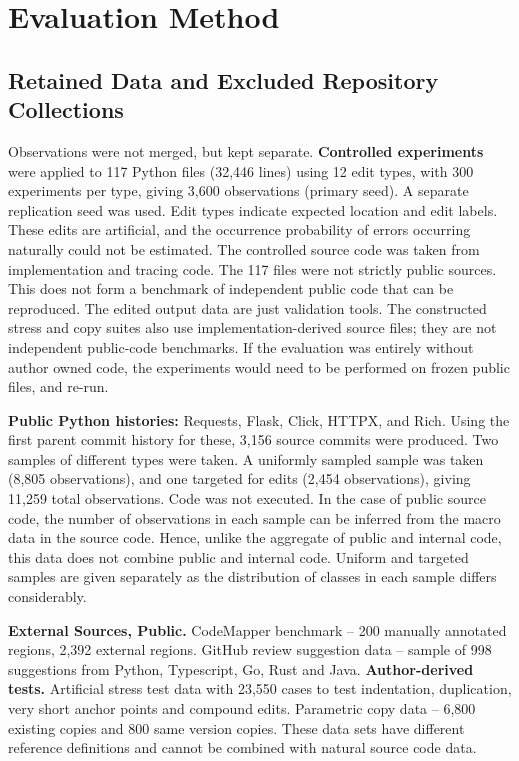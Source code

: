 \documentclass[10pt,conference,letterpaper]{IEEEtran}
\begin{document}
\section{Evaluation Method}
\subsection{Retained Data and Excluded Repository Collections}
Observations were not merged, but kept separate. \textbf{Controlled experiments} were applied to 117 Python files (32,446 lines) using 12 edit types, with 300 experiments per type, giving 3,600 observations (primary seed). A separate replication seed was used. Edit types indicate expected location and edit labels. These edits are artificial, and the occurrence probability of errors occurring naturally could not be estimated. The controlled source code was taken from implementation and tracing code. The 117 files were not strictly public sources. This does not form a benchmark of independent public code that can be reproduced. The edited output data are just validation tools. The constructed stress and copy suites also use implementation-derived source files; they are not independent public-code benchmarks. If the evaluation was entirely without author owned code, the experiments would need to be performed on frozen public files, and re-run.

\textbf{Public Python histories:} Requests, Flask, Click, HTTPX, and Rich. Using the first parent commit history for these, 3,156 source commits were produced. Two samples of different types were taken. A uniformly sampled sample was taken (8,805 observations), and one targeted for edits (2,454 observations), giving 11,259 total observations. Code was not executed. In the case of public source code, the number of observations in each sample can be inferred from the macro data in the source code. Hence, unlike the aggregate of public and internal code, this data does not combine public and internal code. Uniform and targeted samples are given separately as the distribution of classes in each sample differs considerably.

\textbf{External Sources, Public.} CodeMapper benchmark \cite{codemapper2026} – 200 manually annotated regions, 2,392 external regions. GitHub review suggestion data – sample of 998 suggestions from Python, Typescript, Go, Rust and Java. \textbf{Author-derived tests.} Artificial stress test data with 23,550 cases to test indentation, duplication, very short anchor points and compound edits. Parametric copy data – 6,800 existing copies and 800 same version copies. These data sets have different reference definitions and cannot be combined with natural source code data.
\end{document}
